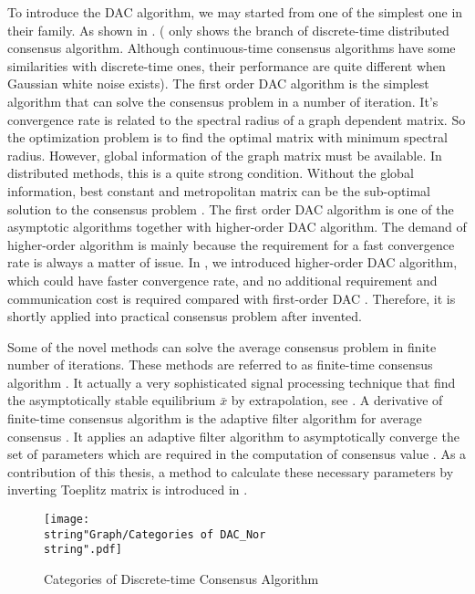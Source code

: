 To introduce the DAC algorithm, we may started from one of the simplest
one in their family. As shown in .
( only shows the branch
of discrete-time distributed consensus algorithm. Although continuous-time
consensus algorithms have some similarities with discrete-time ones,
their performance are quite different when Gaussian white noise exists).
The first order DAC algorithm is the simplest algorithm that can solve
the consensus problem in a number of iteration. It's convergence rate
is related to the spectral radius of a graph dependent matrix. So
the optimization problem is to find the optimal matrix with minimum
spectral radius. However, global information of the graph matrix must
be available. In distributed methods, this is a quite strong condition.
Without the global information, best constant and metropolitan matrix
can be the sub-optimal solution to the consensus problem \cite{Xiao2004}.
The first order DAC algorithm is one of the asymptotic algorithms
together with higher-order DAC algorithm. The demand of higher-order
algorithm is mainly because the requirement for a fast convergence
rate is always a matter of issue. In ,
we introduced higher-order DAC algorithm, which could have faster
convergence rate, and no additional requirement and communication
cost is required compared with first-order DAC \cite{Xiong2010}.
Therefore, it is shortly applied into practical consensus problem
after invented.  

Some of the novel methods can solve the average consensus problem
in finite number of iterations. These methods are referred to as finite-time
consensus algorithm \cite{Sundaram2007}. It actually a very sophisticated
signal processing technique that find the asymptotically stable equilibrium
$\bar{x}$ by extrapolation, see .
A derivative of finite-time consensus algorithm is the adaptive filter
algorithm for average consensus . It applies an adaptive filter algorithm
to asymptotically converge the set of parameters which are required
in the computation of consensus value \cite{Cavalcante2010}. As a
contribution of this thesis, a method to calculate these necessary
parameters by inverting Toeplitz matrix is introduced in . 

\begin{figure}
\hfill{}\texttt{[image: \\string"Graph/Categories of DAC\_Nor\\string".pdf]}\hfill{}

\caption{\label{fig:Categories-of-Discrete-time}Categories of Discrete-time
Consensus Algorithm}
\end{figure}



\subsection*{}
